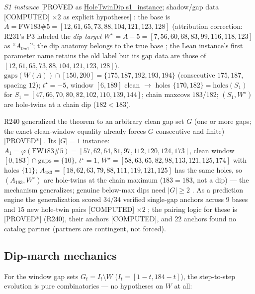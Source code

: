 \documentclass[11pt,a4paper]{article}
\theoremstyle{definition}
\begin{document}
\noindent\textit{S1 instance} [PROVED as \url{HoleTwinDip.s1_instance};
shadow/gap data [COMPUTED] $\times2$ as explicit hypotheses]
\cite{D240,D250}: the base is $A=\mathrm{FW183}\#5=
[12,61,65,73,88,104,121,123,128]$ (attribution correction: R231's P3
labeled the \emph{dip target} $W^\star=A-5=[7,56,60,68,83,99,116,118,123]$
as ``$A_{0w1}$''; the dip anatomy belongs to the true base
\cite{D240}; the Lean instance's first parameter name retains the old
label but its gap data are those of $[12,61,65,73,88,104,121,123,128]$).
$\mathrm{gaps}(W(A))\cap[150,200]=\{175,187,192,193,194\}$ (consecutive
$175,187$, spacing $12$); $t^\star=-5$, window $[6,189]$ clean
$\to$ holes $\{170,182\}=\mathrm{holes}(S_1)$ for
$S_1=[47,66,70,80,82,102,110,139,144]$; chain maxcovs $183$/$182$;
$(S_1,W^\star)$ are hole-twins at a chain dip ($182<183$).

R240 generalized the theorem to an arbitrary clean gap set $G$
(one or more gaps; the exact clean-window equality already forces $G$
consecutive and finite) [PROVED*] \cite{D240}. Its $|G|=1$ instance:
$A_1=\varphi(\mathrm{FW183}\#5)=[57,62,64,81,97,112,120,124,173]$,
clean window $[0,183]\cap\mathrm{gaps}=\{10\}$, $t^\star=1$,
$W^\star=[58,63,65,82,98,113,121,125,174]$ with holes $\{11\}$;
$A_{183}=[18,62,63,79,88,111,119,121,125]$ has the same holes, so
$(A_{183},W^\star)$ are hole-twins at the chain maximum ($183=183$,
not a dip) --- the mechanism generalizes; genuine below-max dips need
$|G|\ge2$ \cite{D247}. As a prediction engine the generalization
scored $34/34$ verified single-gap anchors across $9$ bases and $15$
new hole-twin pairs [COMPUTED] $\times2$ \cite{D243}; the pairing
logic for these is [PROVED*] (R240), their anchors [COMPUTED], and $22$
anchors found no catalog partner (partners are contingent, not
forced).

\subsection{Dip-march mechanics}
\label{sec:dipmarch}

For the window gap sets $G_t=I_t\setminus W$ ($I_t=[1-t,184-t]$), the
step-to-step evolution is pure combinatorics --- no hypotheses on $W$
at all:
\end{document}
